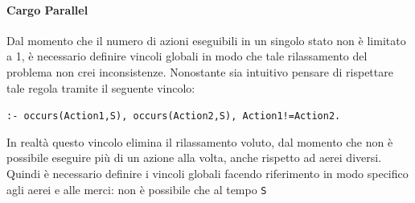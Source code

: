 \documentclass[a4paper,oneside,12pt]{book}
\begin{document}
    \paragraph*{Cargo Parallel\\}
    Dal momento che il numero di azioni eseguibili in un singolo stato non è limitato a 1, è necessario
    definire vincoli globali in modo che tale rilassamento del problema non crei inconsistenze.
    Nonostante sia intuitivo pensare di rispettare tale regola tramite il seguente vincolo:
    \begin{center}
        \texttt{:- occurs(Action1,S), occurs(Action2,S), Action1!=Action2.}
    \end{center}
    In realtà questo vincolo elimina il rilassamento voluto, dal momento che non è possibile eseguire
    più di un azione alla volta, anche rispetto ad aerei diversi.
    Quindi è necessario definire i vincoli globali facendo riferimento in modo specifico agli aerei e alle merci:
    non è possibile che al tempo \texttt{S}
\end{document}

